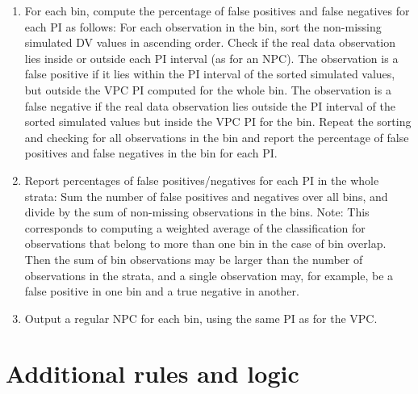 \begin{enumerate}
	\item For each bin, compute the percentage of false positives and false negatives for each PI as follows: 
For each observation in the bin, sort the non-missing simulated DV values in ascending order. Check if the real data observation lies inside or outside each PI interval (as for an NPC). The observation is a false positive if it lies within the PI interval of the sorted simulated values, but outside the VPC PI computed for the whole bin. The observation is a false negative if the real data observation lies outside the PI interval of the sorted simulated values but inside the VPC PI for the bin. Repeat the sorting and checking for all observations in the bin and report the percentage of false positives and false negatives in the bin for each PI.

	\item Report percentages of false positives/negatives for each PI in the whole strata:
Sum the number of false positives and negatives over all bins, and divide by the sum of non-missing observations in  the bins. Note: This corresponds to computing a weighted average of the classification for observations that belong to more than one bin in the case of bin overlap. Then the sum of bin observations may be larger than the number of observations in the strata, and a single observation may, for example, be a false positive in one bin and a true negative in another. 

	\item Output a regular NPC for each bin, using the same PI as for the VPC.
\end{enumerate}


\section{Additional rules and logic}

